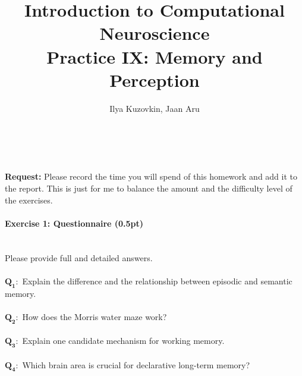 \documentclass[a4paper,11pt]{article}
\author{\large{Ilya Kuzovkin, Jaan Aru}}
\title{\huge{Introduction to Computational Neuroscience}\\\LARGE{Practice IX: Memory and Perception}}
\newenvironment{exercise}[3]{\paragraph{Exercise #1: #2 (#3pt)}\ \\}{
\medskip}
\newcommand{\question}[2]{\setlength\parindent{0mm}\ \\$\mathbf{Q_{#1}:}$ #2\ \\}
\begin{document}
\maketitle


%
%
\ \\

\ \\
\textbf{Request:} Please record the time you will spend of this homework and add it to the report. This is just for me to balance the amount and the difficulty level of the exercises.

%
%
\begin{exercise}{1}{Questionnaire}{0.5}
Please provide full and detailed answers.\\
\question{1}{Explain the difference and the relationship between episodic and semantic memory.}
\question{2}{How does the Morris water maze work?}
\question{3}{Explain one candidate mechanism for working memory.}
\question{4}{Which brain area is crucial for declarative long-term memory?}
\end{exercise}
\end{document}
